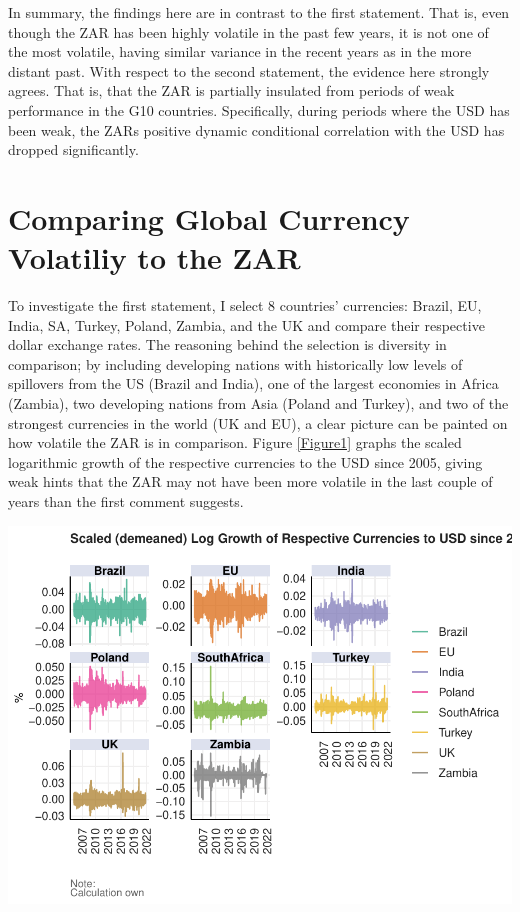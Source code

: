 \documentclass[11pt,preprint, authoryear]{elsarticle}
\let\origfigure\figure
\let\endorigfigure\endfigure
\renewenvironment{figure}[1][2] {
    \expandafter\origfigure\expandafter[H]
} {
    \endorigfigure
}
\numberwithin{equation}{section}
\numberwithin{figure}{section}
\numberwithin{table}{section}
\begin{document}
In summary, the findings here are in contrast to the first statement.
That is, even though the ZAR has been highly volatile in the past few
years, it is not one of the most volatile, having similar variance in
the recent years as in the more distant past. With respect to the second
statement, the evidence here strongly agrees. That is, that the ZAR is
partially insulated from periods of weak performance in the G10
countries. Specifically, during periods where the USD has been weak, the
ZARs positive dynamic conditional correlation with the USD has dropped
significantly.

\hypertarget{comparing-global-currency-volatiliy-to-the-zar}{%
\section{Comparing Global Currency Volatiliy to the
ZAR}\label{comparing-global-currency-volatiliy-to-the-zar}}

To investigate the first statement, I select 8 countries' currencies:
Brazil, EU, India, SA, Turkey, Poland, Zambia, and the UK and compare
their respective dollar exchange rates. The reasoning behind the
selection is diversity in comparison; by including developing nations
with historically low levels of spillovers from the US (Brazil and
India), one of the largest economies in Africa (Zambia), two developing
nations from Asia (Poland and Turkey), and two of the strongest
currencies in the world (UK and EU), a clear picture can be painted on
how volatile the ZAR is in comparison. Figure \ref{Figure1} graphs the
scaled logarithmic growth of the respective currencies to the USD since
2005, giving weak hints that the ZAR may not have been more volatile in
the last couple of years than the first comment suggests.

\begin{figure}[H]

{\centering \includegraphics{Question5_files/figure-latex/Scaled Growth Plot-1} 

}

\caption{Scaled (demeaned) Log Growth of Respective Currencies to USD since 2005. \label{Figure1}}\label{fig:Scaled Growth Plot}
\end{figure}
\end{document}
